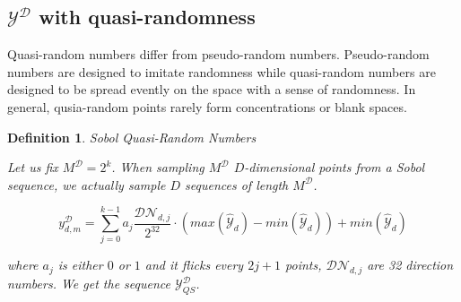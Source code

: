 \documentclass[shortabstract]{iithesis}
\newtheorem{definition}{Definition}
\begin{document}










\subsection{$\mathcal{Y}^{\mathcal{D}}$ with quasi-randomness}

Quasi-random numbers differ from pseudo-random numbers. Pseudo-random numbers are designed to imitate randomness while quasi-random numbers are designed to be spread evently on the space with a sense of randomness. In general, qusia-random points rarely form concentrations or blank spaces. 



\begin{definition} {Sobol Quasi-Random Numbers}

    Let us fix $M^{\mathcal  D}=2^k$. When sampling $M^{\mathcal  D}$ $D$-dimensional points from a Sobol sequence, we actually sample $D$ sequences of length $M^{\mathcal  D}$.
    
    \begin{equation*}
        y^{\mathcal D}_{d, m} = \sum_{j=0}^{k-1} a_j \frac{\mathcal{DN}_{d, j}}{2^{32}}  \cdot  (max (\hat{\mathcal{Y}}_d)  - min(\hat{\mathcal{Y}}_d))  + min(\hat{\mathcal{Y}}_d)
    \end{equation*}

    where $a_j$ is either $0$ or $1$ and it flicks every $2j+1$ points, $\mathcal{DN}_{d, j}$ are 32 direction numbers.  
     We get the sequence $\mathcal Y ^{\mathcal D}_{QS}$.
\end{definition}
\end{document}
